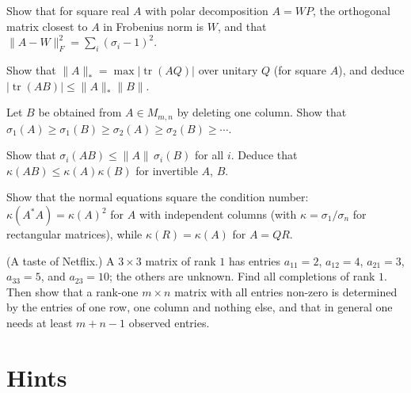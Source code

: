 \begin{exercise}[$\star\star$]\label{ex:nearestorth}
Show that for square real $A$ with polar decomposition $A=WP$, the orthogonal matrix closest to $A$ in Frobenius norm is
$W$, and that $\|A-W\|_F^2=\sum_i(\sigma_i-1)^2$.
\end{exercise}

\begin{exercise}[$\star\star$]\label{ex:nuclear}
Show that $\|A\|_*=\max|\operatorname{tr}(AQ)|$ over unitary $Q$ (for square $A$), and deduce $|\operatorname{tr}(AB)|\le\|A\|_*
\|B\|$.
\end{exercise}

\begin{exercise}[$\star\star$]\label{ex:svinterlace}
Let $B$ be obtained from $A\in M_{m,n}$ by deleting one column. Show that $\sigma_1(A)\ge\sigma_1(B)\ge\sigma_2(A)\ge\sigma_2(B)
\ge\cdots$.
\end{exercise}

\begin{exercise}[$\star\star$]\label{ex:svprod}
Show that $\sigma_i(AB)\le\|A\|\,\sigma_i(B)$ for all $i$. Deduce that $\kappa(AB)\le\kappa(A)\kappa(B)$ for invertible $A$,
$B$.
\end{exercise}

\begin{exercise}[$\star\star$]\label{ex:normal2x2}
Show that the normal equations square the condition number: $\kappa(A^*A)=\kappa(A)^2$ for $A$ with independent columns
(with $\kappa=\sigma_1/\sigma_n$ for rectangular matrices), while $\kappa(R)=\kappa(A)$ for $A=QR$.
\end{exercise}

\begin{exercise}[$\star\star\star$]\label{ex:matrixcompletion}
(A taste of Netflix.) A $3\times3$ matrix of rank $1$ has entries $a_{11}=2$, $a_{12}=4$, $a_{21}=3$, $a_{33}=5$, and
$a_{23}=10$; the others are unknown. Find all completions of rank $1$. Then show that a rank-one $m\times n$ matrix with all
entries non-zero is determined by the entries of one row, one column and nothing else, and that in general one needs
at least $m+n-1$ observed entries.
\end{exercise}

\section{Hints}

